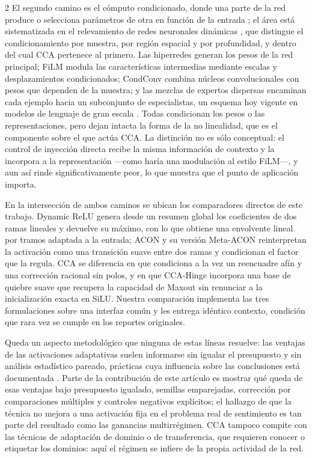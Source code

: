 \begin{multicols}{2}
El segundo camino es el cómputo condicionado, donde una parte de la red produce o selecciona parámetros de otra en función de la entrada \cite{bengio2013conditional}; el área está sistematizada en el relevamiento de redes neuronales dinámicas \cite{han2022dynamic}, que distingue el condicionamiento por muestra, por región espacial y por profundidad, y dentro del cual CCA pertenece al primero. Las hiperredes \cite{ha2017hypernetworks} generan los pesos de la red principal; FiLM \cite{perez2018film} modula las características intermedias mediante escalas y desplazamientos condicionados; CondConv \cite{yang2019condconv} combina núcleos convolucionales con pesos que dependen de la muestra; y las mezclas de expertos dispersas \cite{shazeer2017moe} encaminan cada ejemplo hacia un subconjunto de especialistas, un esquema hoy vigente en modelos de lenguaje de gran escala \cite{jiang2024mixtral}. Todas condicionan los pesos o las representaciones, pero dejan intacta la forma de la no linealidad, que es el componente sobre el que actúa CCA. La distinción no es sólo conceptual: el control de inyección directa recibe la misma información de contexto y la incorpora a la representación —como haría una modulación al estilo FiLM—, y aun así rinde significativamente peor, lo que muestra que el punto de aplicación importa.

En la intersección de ambos caminos se ubican los comparadores directos de este trabajo. Dynamic ReLU \cite{chen2020dynamic} genera desde un resumen global los coeficientes de dos ramas lineales y devuelve su máximo, con lo que obtiene una envolvente lineal por tramos adaptada a la entrada; ACON y su versión Meta-ACON \cite{ma2021activate} reinterpretan la activación como una transición suave entre dos ramas y condicionan el factor que la regula. CCA se diferencia en que condiciona a la vez un reencuadre afín y una corrección racional sin polos, y en que CCA-Hinge incorpora una base de quiebre suave que recupera la capacidad de Maxout sin renunciar a la inicialización exacta en SiLU. Nuestra comparación implementa las tres formulaciones sobre una interfaz común y les entrega idéntico contexto, condición que rara vez se cumple en los reportes originales.

Queda un aspecto metodológico que ninguna de estas líneas resuelve: las ventajas de las activaciones adaptativas suelen informarse sin igualar el presupuesto y sin análisis estadístico pareado, prácticas cuya influencia sobre las conclusiones está documentada \cite{bouthillier2021accounting}. Parte de la contribución de este artículo es mostrar qué queda de esas ventajas bajo presupuesto igualado, semillas emparejadas, corrección por comparaciones múltiples \cite{holm1979simple} y controles negativos explícitos; el hallazgo de que la técnica no mejora a una activación fija en el problema real de sentimiento es tan parte del resultado como las ganancias multirrégimen. CCA tampoco compite con las técnicas de adaptación de dominio o de transferencia, que requieren conocer o etiquetar los dominios: aquí el régimen se infiere de la propia actividad de la red.


\end{multicols}
